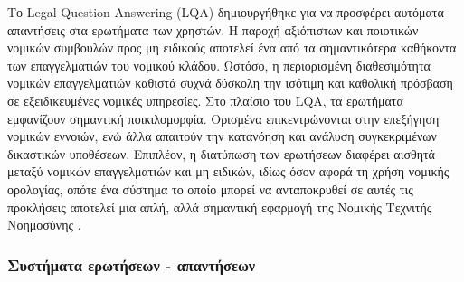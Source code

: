 \documentclass{article}
\begin{document}
\par Το Legal Question Answering (LQA) δημιουργήθηκε για να προσφέρει αυτόματα απαντήσεις στα ερωτήματα των χρηστών. Η παροχή αξιόπιστων και ποιοτικών νομικών συμβουλών προς μη ειδικούς αποτελεί ένα από τα σημαντικότερα καθήκοντα των επαγγελματιών του νομικού κλάδου. Ωστόσο, η περιορισμένη διαθεσιμότητα νομικών επαγγελματιών καθιστά συχνά δύσκολη την ισότιμη και καθολική πρόσβαση σε εξειδικευμένες νομικές υπηρεσίες. Στο πλαίσιο του LQA, τα ερωτήματα εμφανίζουν σημαντική ποικιλομορφία. Ορισμένα επικεντρώνονται στην επεξήγηση νομικών εννοιών, ενώ άλλα απαιτούν την κατανόηση και ανάλυση συγκεκριμένων δικαστικών υποθέσεων. Επιπλέον, η διατύπωση των ερωτήσεων διαφέρει αισθητά μεταξύ νομικών επαγγελματιών και μη ειδικών, ιδίως όσον αφορά τη χρήση νομικής ορολογίας, οπότε ένα σύστημα το οποίο μπορεί να ανταποκρυθεί σε αυτές τις προκλήσεις αποτελεί μια απλή, αλλά σημαντική εφαρμογή της Νομικής Τεχνιτής Νοημοσύνης \cite{zhong-2020}.

\subsubsection{Συστήματα ερωτήσεων - απαντήσεων}
\cite{abdallah-2023}
\end{document}
